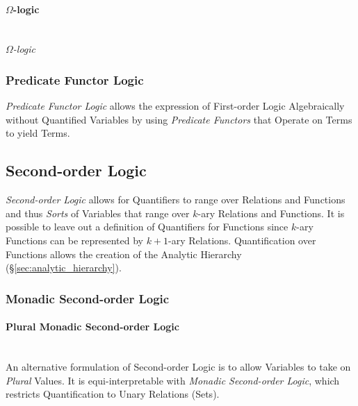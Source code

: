 \paragraph{$\Omega$-logic}\label{sec:omega_logic}\hfill \\

\emph{$\Omega$-logic}



\subsubsection{Predicate Functor Logic}\label{sec:pfl}

\emph{Predicate Functor Logic} allows the expression of First-order
Logic Algebraically without Quantified Variables by using
\emph{Predicate Functors} that Operate on Terms to yield Terms.



\subsection{Second-order Logic}\label{sec:secondorder_logic}

\emph{Second-order Logic} allows for Quantifiers to range over
Relations and Functions and thus \emph{Sorts} of Variables that range
over $k$-ary Relations and Functions. It is possible to leave out a
definition of Quantifiers for Functions since $k$-ary Functions can be
represented by $k+1$-ary Relations.\cite{shapiro00} Quantification
over Functions allows the creation of the Analytic Hierarchy
(\S\ref{sec:analytic_hierarchy}).



\subsubsection{Monadic Second-order Logic}\label{sec:monadic_secondorder}

\paragraph{Plural Monadic Second-order Logic}
\label{sec:plural_monadic_secondorder}\hfill \\

An alternative formulation of Second-order Logic is to allow Variables
to take on \emph{Plural} Values. It is equi-interpretable with
\emph{Monadic Second-order Logic}, which restricts Quantification to
Unary Relations (Sets).




